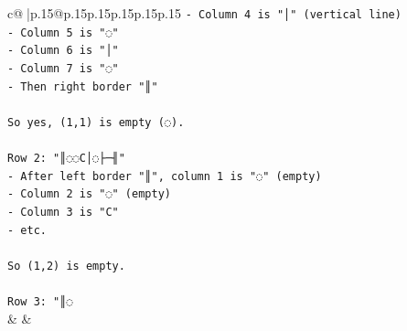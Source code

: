 \documentclass{article}
\begin{document}
{\begin{supertabular}{c@{$\;$}|p{.15\linewidth}@{}p{.15\linewidth}p{.15\linewidth}p{.15\linewidth}p{.15\linewidth}p{.15\linewidth}}
{{{\texttt{{-} Column 4 is "│" (vertical line)} \\
\texttt{{-} Column 5 is "◌"} \\
\texttt{{-} Column 6 is "│"} \\
\texttt{{-} Column 7 is "◌"} \\
\texttt{{-} Then right border "║"} \\
\\ 
\texttt{So yes, (1,1) is empty (◌).} \\
\\ 
\texttt{Row 2: "║◌◌C│◌├─╢"} \\
\texttt{{-} After left border "║", column 1 is "◌" (empty)} \\
\texttt{{-} Column 2 is "◌" (empty)} \\
\texttt{{-} Column 3 is "C"} \\
\texttt{{-} etc.} \\
\\ 
\texttt{So (1,2) is empty.} \\
\\ 
\texttt{Row 3: "║◌} \\
            }
        }
    }
    & & \\ \\


\end{supertabular}}
\end{document}
